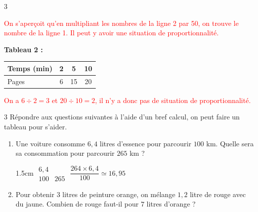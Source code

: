 \documentclass[a4paper]{book}
\begin{document}
{\begin{exerciceNote}{3}
\begin{minipage}{0.45\linewidth}
            \textcolor{red}{On s’aperçoit qu'en multipliant les nombres de la ligne 2 par 50, on trouve le nombre de la ligne 1. Il peut y avoir une situation de proportionnalité.}
        \end{minipage}
        \hfill\vline\hfill
        \begin{minipage}{0.45\linewidth}
            \begin{center}
                \textbf{Tableau 2 :} \begin{tabular}{|l|c|c|c|} 
                \hline Temps (min) & 2 & 5 & 10 \\ 
                \hline Pages & 6 & 15 & 20 \\ \hline 
                \end{tabular}
            \end{center}

            \medskip
            
            \textcolor{red}{On a $6\div2=3$ et $20\div10=2$, il n'y a donc pas de situation de proportionnalité.}
        \end{minipage}           
    \end{exerciceNote}


\newpage

\raggedright


    \begin{exerciceNote}{3}
        Répondre aux questions suivantes à l'aide d'un bref calcul, on peut faire un tableau pour s'aider.

        \begin{enumerate}[leftmargin=*]
            \item Une voiture consomme $6,4$ litres d'essence pour parcourir $100$ km. Quelle sera sa consommation pour parcourir $265$ km ?

            \begin{ZoneReponse}{1.5cm}
                $\begin{array}{c|c}
                     6,4 &  \\ \hline
                     100 & 265
                \end{array}$ \quad 
                $\dfrac{264\times6,4}{100}\simeq 16,95$
            \end{ZoneReponse}

            \item Pour obtenir $3$ litres de peinture orange, on mélange $1,2$ litre de rouge avec du jaune. Combien de rouge faut-il pour $7$ litres d'orange ?


\end{enumerate}
\end{exerciceNote}}
\end{document}
